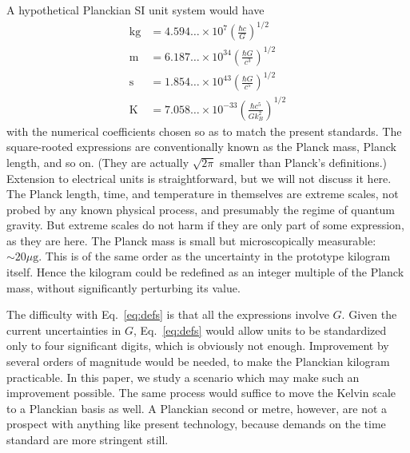 \documentclass[prb,preprint]{revtex4-1}
\begin{document}
A hypothetical Planckian SI unit system would have
\begin{equation} \label{eq:defs}
\begin{aligned}
\mathrm{kg} &= 4.594\ldots \times 10^7
               \left(\frac{\hbar c}{G}\right)^{\!1/2} \\
\mathrm{m}  &= 6.187\ldots \times 10^{34}
               \left(\frac{\hbar G}{c^3}\right)^{\!1/2} \\
\mathrm{s}  &= 1.854\ldots \times 10^{43}
               \left(\frac{\hbar G}{c^5}\right)^{\!1/2} \\
\mathrm{K}  &= 7.058\ldots \times 10^{-33}
               \left(\frac{\hbar c^5}{Gk_B^2}\right)^{\!1/2}
\end{aligned}
\end{equation}
with the numerical coefficients chosen so as to match the present
standards.  The square-rooted expressions are conventionally known as
the Planck mass, Planck length, and so on.  (They are actually
$\sqrt{2\pi}$ smaller than Planck's definitions.)  Extension to
electrical units is straightforward, but we will not discuss it here.
The Planck length, time, and temperature in themselves are extreme
scales, not probed by any known physical process, and presumably the
regime of quantum gravity.  But extreme scales do not harm if they are
only part of some expression, as they are here.  The Planck mass is
small but microscopically measurable: $\sim20\mu\mathrm{g}$.  This is
of the same order as the uncertainty in the prototype kilogram itself.\cite{BIPM}
Hence the kilogram could be redefined as an integer multiple of the
Planck mass, without significantly perturbing its value.

The difficulty with Eq.~\eqref{eq:defs} is that all the expressions
involve $G$.  Given the current uncertainties in $G$,\cite{CODATA16}
Eq.~\eqref{eq:defs} would allow units to be standardized only to four
significant digits, which is obviously not enough.  Improvement by
several orders of magnitude would be needed, to make the Planckian
kilogram practicable.  In this paper, we study a scenario which may
make such an improvement possible.  The same process would suffice to
move the Kelvin scale to a Planckian basis as well.  A Planckian
second or metre, however, are not a prospect with anything like
present technology, because demands on the time standard are more
stringent still.
\end{document}
